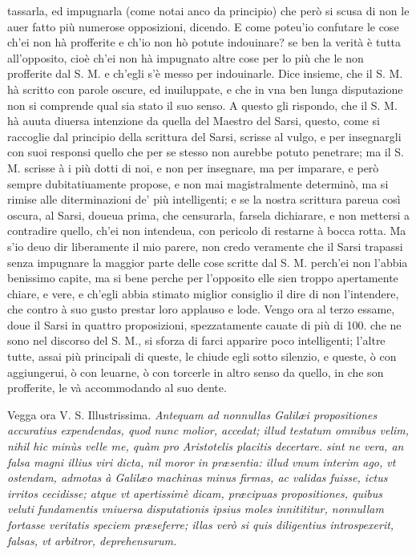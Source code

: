 \documentclass[11pt,twoside,openany]{book}
\begin{document}
tassarla, ed impugnarla (come notai anco da principio) che però si scusa di non le auer fatto più numerose opposizioni, dicendo. E come poteu'io confutare le cose ch'ei non hà profferite e ch'io non hò potute indouinare? se ben la verità è tutta all'opposito, cioè ch'ei non hà impugnato altre cose per lo più che le non profferite dal S. M. e ch'egli s'è messo per indouinarle. Dice insieme, che il S. M. hà scritto con parole oscure, ed inuiluppate, e che in vna ben lunga disputazione non si comprende qual sia stato il suo senso. A questo gli rispondo, che il S. M. hà auuta diuersa intenzione da quella del Maestro del Sarsi, questo, come si raccoglie dal principio della scrittura del Sarsi, scrisse al vulgo, e per insegnargli con suoi responsi quello che per se stesso non aurebbe potuto penetrare; ma il S. M. scrisse à i più dotti di noi, e non per insegnare, ma per imparare, e però sempre dubitatiuamente propose, e non mai magistralmente determinò, ma si rimise alle diterminazioni de' più intelligenti; e se la nostra scrittura pareua così oscura, al Sarsi, doueua prima, che censurarla, farsela dichiarare, e non mettersi a contradire quello, ch'ei non intendeua, con pericolo di restarne à bocca rotta. Ma s'io deuo dir liberamente il mio parere, non credo veramente che il Sarsi trapassi senza impugnare la maggior parte delle cose scritte dal S. M. perch'ei non l'abbia benissimo capite, ma si bene perche per l'opposito elle sien troppo apertamente chiare, e vere, e ch'egli abbia stimato miglior consiglio il dire di non l'intendere, che contro à suo gusto prestar loro applauso e lode. Vengo ora al terzo essame, doue il Sarsi in quattro proposizioni, spezzatamente cauate di più di 100. che ne sono nel discorso del S. M., si sforza di farci apparire poco intelligenti; l'altre tutte, assai più principali di queste, le chiude egli sotto silenzio, e queste, ò con aggiungerui, ò con leuarne, ò con torcerle in altro senso da quello, in che son profferite, le và accommodando al suo dente.



\par\bigskip\noindent{}\enspace Vegga ora V. S. Illustrissima. \textit{Antequam ad nonnullas Galilæi propositiones accuratius expendendas, quod nunc molior, accedat; illud testatum omnibus velim, nihil hic minùs velle me, quàm pro Aristotelis placitis decertare. sint ne vera, an falsa magni illius viri dicta, nil moror in præsentia: illud vnum interim ago, vt ostendam, admotas à Galilæo}\textsc{ }\textit{machinas minus firmas, ac validas fuisse, ictus irritos cecidisse; atque vt apertissimè dicam, præcipuas propositiones, quibus veluti fundamentis vniuersa }\textit{disputationis ipsius moles innitititur, nonnullam fortasse veritatis speciem præseferre; illas verò si quis diligentius introspexerit, falsas, vt arbitror, deprehensurum.}
\end{document}
